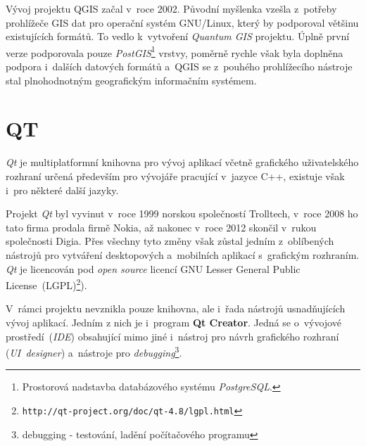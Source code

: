 Vývoj projektu QGIS začal v~roce 2002. Původní myšlenka vzešla z~potřeby 
prohlížeče GIS dat pro operační systém GNU/Linux, který by podporoval většinu 
existujících formátů. To vedlo k~vytvoření \textit{Quantum GIS} projektu. Úplně 
první verze podporovala pouze \textit{PostGIS}\footnote{Prostorová nadstavba 
databázového systému \textit{PostgreSQL}.} vrstvy, poměrně rychle však byla 
doplněna podpora i~dalších datových formátů a~QGIS se z~pouhého prohlížecího 
nástroje stal plnohodnotným geografickým informačním systémem.




\section{QT}
\label{qt}

\textit{Qt} je multiplatformní knihovna pro vývoj aplikací včetně grafického 
uživatelského rozhraní určená především pro vývojáře pracující v~jazyce C++,
existuje však i~pro některé další jazyky.

Projekt \textit{Qt} byl vyvinut v~roce 1999 norskou společností Trolltech, 
v~roce 2008 ho tato firma prodala firmě Nokia, až nakonec v~roce 2012 skončil 
v~rukou společnosti Digia. Přes všechny tyto změny však zůstal jedním z~oblíbených
nástrojů pro vytváření desktopových a~mobilních aplikací s~grafickým rozhraním.
\textit{Qt} je licencován pod \textit{open source} licencí GNU Lesser General 
Public License~(LGPL)\footnote{\texttt{http://qt-project.org/doc/qt-4.8/lgpl.html}}).

V~rámci projektu nevznikla pouze knihovna, ale i~řada nástrojů usnadňujících
vývoj aplikací. Jedním z nich je i~program \textbf{Qt Creator}. Jedná se o~vývojové 
prostředí~(\textit{IDE}) obsahující mimo jiné i~nástroj pro návrh grafického 
rozhraní (\textit{UI~designer}) a~nástroje pro \textit{debugging}\footnote{debugging
 - testování, ladění počítačového programu}.

